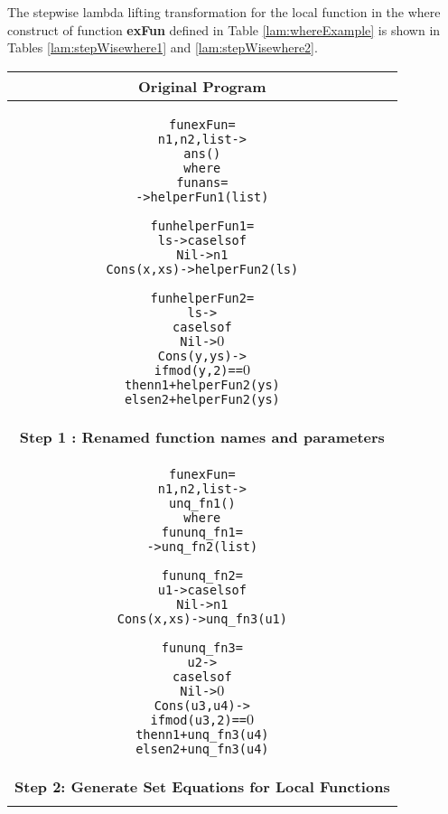 \documentclass[11pt]{article}
\begin{document}
The stepwise lambda lifting transformation for the local function in the {\sf where} construct of function {\bf exFun} defined in Table \ref {lam:whereExample} is shown in Tables \ref {lam:stepWisewhere1} and  \ref {lam:stepWisewhere2}.

\begin{table}
\begin{center}
\begin{tabular}{|c|} \hline
{\bf Original Program}\\ 
\hline
\begin{minipage}{4in}
\begin{alltt}


  fun exFun = 
    n1,n2,list -> 
        ans()
      where
        fun ans =
               -> helperFun1 (list)

        fun helperFun1 = 
            ls -> case ls of 
                    Nil -> n1
                    Cons(x,xs) -> helperFun2(ls)

        fun helperFun2 =
            ls -> 
              case ls of
                Nil -> \(0\)
                Cons(y,ys) ->
                  if mod(y,2) == \(0\) 
                    then n1 + helperFun2(ys)
                    else n2 + helperFun2(ys) 

\end{alltt} 
\end {minipage} \\ 
\hline 
{\bf Step 1 : Renamed function names and parameters }\\ 
\hline
\begin{minipage}{4in}
\begin{alltt}


  fun exFun = 
    n1,n2,list -> 
        unq_fn1()
      where
        fun unq_fn1 =
            -> unq_fn2(list)

        fun unq_fn2 = 
          u1 -> case ls of 
                  Nil -> n1
                  Cons(x,xs) -> unq_fn3(u1)

        fun unq_fn3 =
          u2 -> 
            case ls of
              Nil -> \(0\)
              Cons(u3,u4) ->
                if mod(u3,2) == \(0\) 
                  then n1 + unq_fn3(u4)
                  else n2 + unq_fn3(u4) 

\end{alltt} 
\end {minipage}\\ 
\hline 
{\bf Step 2: Generate Set Equations for Local Functions}\\ 
\hline 
\begin{minipage}{4in}
\begin{alltt}



\end{alltt}
\end{minipage}
\end{tabular}
\end{center}
\end{table}
\end{document}

